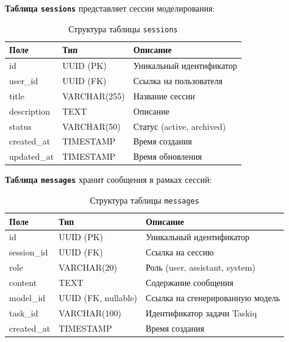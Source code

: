 \textbf{Таблица \texttt{sessions}} представляет сессии моделирования:

\begin{table}[H]
    \centering
    \caption{Структура таблицы \texttt{sessions}}
    \begin{tabular}{|l|l|l|}
        \hline
        \textbf{Поле} & \textbf{Тип} & \textbf{Описание} \\
        \hline
        id & UUID (PK) & Уникальный идентификатор \\
        \hline
        user\_id & UUID (FK) & Ссылка на пользователя \\
        \hline
        title & VARCHAR(255) & Название сессии \\
        \hline
        description & TEXT & Описание \\
        \hline
        status & VARCHAR(50) & Статус (active, archived) \\
        \hline
        created\_at & TIMESTAMP & Время создания \\
        \hline
        updated\_at & TIMESTAMP & Время обновления \\
        \hline
    \end{tabular}
\end{table}

\textbf{Таблица \texttt{messages}} хранит сообщения в рамках сессий:

\begin{table}[H]
    \centering
    \caption{Структура таблицы \texttt{messages}}
    \begin{tabular}{|l|l|l|}
        \hline
        \textbf{Поле} & \textbf{Тип} & \textbf{Описание} \\
        \hline
        id & UUID (PK) & Уникальный идентификатор \\
        \hline
        session\_id & UUID (FK) & Ссылка на сессию \\
        \hline
        role & VARCHAR(20) & Роль (user, assistant, system) \\
        \hline
        content & TEXT & Содержание сообщения \\
        \hline
        model\_id & UUID (FK, nullable) & Ссылка на сгенерированную модель \\
        \hline
        task\_id & VARCHAR(100) & Идентификатор задачи Taskiq \\
        \hline
        created\_at & TIMESTAMP & Время создания \\
        \hline
    \end{tabular}
\end{table}

